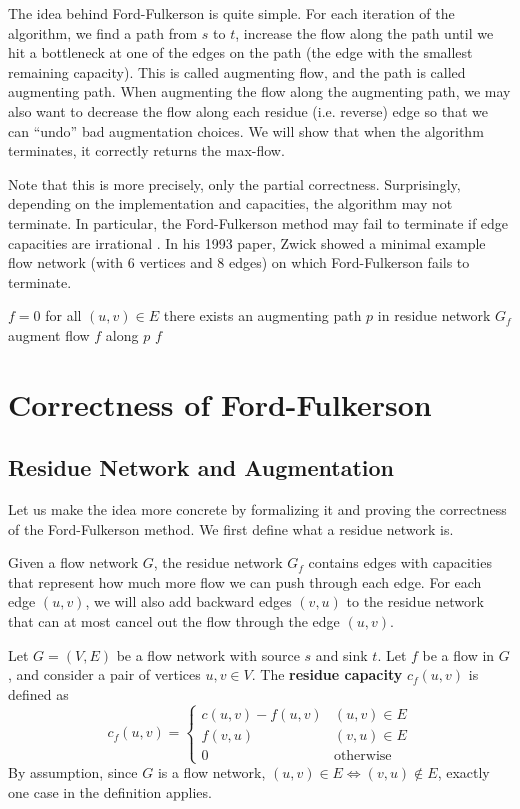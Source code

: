 The idea behind Ford-Fulkerson is quite simple. For each iteration of the algorithm, we find a path from $s$ to $t$, increase the flow along the path until we hit a bottleneck at one of the edges on the path (the edge with the smallest remaining capacity). This is called augmenting flow, and the path is called augmenting path. When augmenting the flow along the augmenting path, we may also want to decrease the flow along each residue (i.e. reverse) edge so that we can ``undo'' bad augmentation choices. We will show that when the algorithm terminates, it correctly returns the max-flow.

Note that this is more precisely, only the partial correctness. Surprisingly, depending on the implementation and capacities, the algorithm may not terminate. In particular, the Ford-Fulkerson method may fail to terminate if edge capacities are irrational \cite{Zwick-FF-Example}. In his 1993 paper, Zwick showed a minimal example flow network (with 6 vertices and 8 edges) on which Ford-Fulkerson fails to terminate.

\begin{codebox}
    \li $f = 0$ for all $(u,v) \in E$ 
    \li \While there exists an augmenting path $p$ in residue network $G_f$ \Do
        \li augment flow $f$ along $p$
    \End
    \li \Return $f$
\end{codebox}

\section{Correctness of Ford-Fulkerson}

\subsection{Residue Network and Augmentation}

Let us make the idea more concrete by formalizing it and proving the correctness of the Ford-Fulkerson method. We first define what a residue network is.

Given a flow network $G$, the residue network $G_f$ contains edges with capacities that represent how much more flow we can push through each edge. For each edge $(u,v)$, we will also add backward edges $(v,u)$ to the residue network that can at most cancel out the flow through the edge $(u,v)$.

\begin{definition} 
    Let $G=(V,E)$ be a flow network with source $s$ and sink $t$. Let $f$ be a flow in $G$, and consider a pair of vertices $u,v \in V$. The \textbf{residue capacity} $c_f(u,v)$ is defined as
    $$
    c_f(u,v) = \begin{cases}
        c(u,v) - f(u,v) & (u,v) \in E \\
        f(v,u) & (v,u) \in E \\
        0 & \text{otherwise}
    \end{cases}
    $$
    By assumption, since $G$ is a flow network, $(u,v) \in E \iff (v,u) \not\in E$, exactly one case in the definition applies.
\end{definition}

